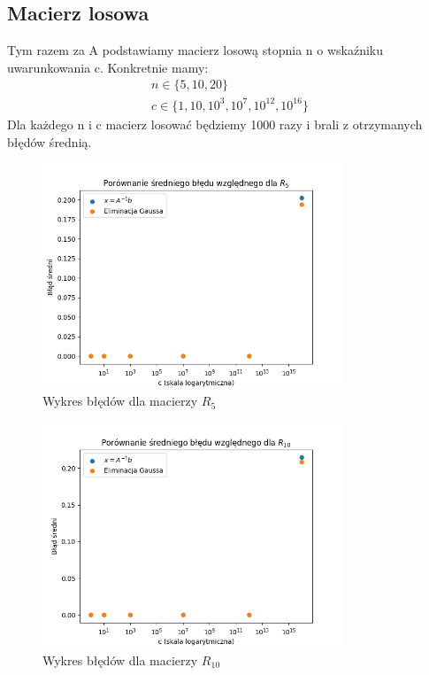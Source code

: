 \documentclass{article}
\begin{document}
\subsection*{Macierz losowa}
Tym razem za A podstawiamy macierz losową stopnia n
o wskaźniku uwarunkowania c. Konkretnie mamy:
\begin{gather*}
n \in \{5,10,20\}\\
c \in \{1,10,10^3,10^7,10^{12},10^{16}\}
\end{gather*}
Dla każdego n i c macierz losować będziemy 1000 razy
i brali z otrzymanych błędów średnią.

\begin{figure}[H]
  \centering
  \includegraphics[width=0.8\textwidth]{../images/random_n_5.png}
  \caption{Wykres błędów dla macierzy $R_5$}
\end{figure}
\begin{figure}[H]
  \centering
  \includegraphics[width=0.8\textwidth]{../images/random_n_10.png}
  \caption{Wykres błędów dla macierzy $R_{10}$}
\end{figure}
\end{document}
